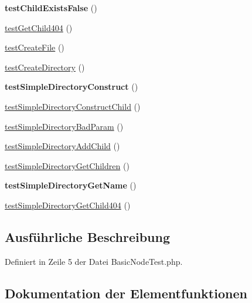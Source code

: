 \begin{DoxyCompactItemize}
{\bfseries test\+Child\+Exists\+False} ()
\item 
\mbox{\hyperlink{class_sabre_1_1_d_a_v_1_1_basic_node_test_a84c060887cceea53561f75719cbf84f6}{test\+Get\+Child404}} ()
\item 
\mbox{\hyperlink{class_sabre_1_1_d_a_v_1_1_basic_node_test_abd598a3d1c918aec62bdca4a9aa086e1}{test\+Create\+File}} ()
\item 
\mbox{\hyperlink{class_sabre_1_1_d_a_v_1_1_basic_node_test_a939a73779d460912e5c7d2ce435b3be1}{test\+Create\+Directory}} ()
\item 
\mbox{\label{class_sabre_1_1_d_a_v_1_1_basic_node_test_a0d310295f5535ddb32304423a368a422}} 
{\bfseries test\+Simple\+Directory\+Construct} ()
\item 
\mbox{\hyperlink{class_sabre_1_1_d_a_v_1_1_basic_node_test_a1f92ebef93c54007d65487fafc2b00a2}{test\+Simple\+Directory\+Construct\+Child}} ()
\item 
\mbox{\hyperlink{class_sabre_1_1_d_a_v_1_1_basic_node_test_afb8ab91bf91385be73c09f5b068b8784}{test\+Simple\+Directory\+Bad\+Param}} ()
\item 
\mbox{\hyperlink{class_sabre_1_1_d_a_v_1_1_basic_node_test_a9daaebce1931ab6f99f3c9d19872572d}{test\+Simple\+Directory\+Add\+Child}} ()
\item 
\mbox{\hyperlink{class_sabre_1_1_d_a_v_1_1_basic_node_test_a59a7ed3c8cbc7869e56f3c9d2e74cdaf}{test\+Simple\+Directory\+Get\+Children}} ()
\item 
\mbox{\label{class_sabre_1_1_d_a_v_1_1_basic_node_test_afe874a122860af0f67dc82a04f08dfe5}} 
{\bfseries test\+Simple\+Directory\+Get\+Name} ()
\item 
\mbox{\hyperlink{class_sabre_1_1_d_a_v_1_1_basic_node_test_a2a5b3336620a4d2015526baac5f9a36e}{test\+Simple\+Directory\+Get\+Child404}} ()
\end{DoxyCompactItemize}


\subsection{Ausführliche Beschreibung}


Definiert in Zeile 5 der Datei Basic\+Node\+Test.\+php.



\subsection{Dokumentation der Elementfunktionen}
\mbox{\label{class_sabre_1_1_d_a_v_1_1_basic_node_test_a939a73779d460912e5c7d2ce435b3be1}} 

